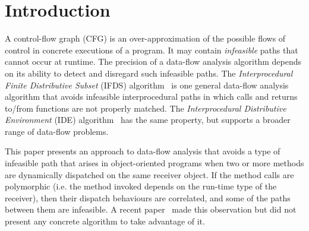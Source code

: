 \section{Introduction}


A control-flow graph (CFG) is an over-approximation of the possible flows 
of control in concrete executions of a program. It may contain \textit{infeasible} 
paths that cannot occur at runtime. The precision of a data-flow analysis algorithm
depends on its ability to detect and disregard such infeasible paths.
The \textit{Interprocedural Finite Distributive Subset} (IFDS) algorithm~\cite{reps1995precise}
is one general data-flow analysis algorithm that 
avoids infeasible interprocedural paths in which calls 
and returns to/from functions are not properly matched. %
The \textit{Interprocedural Distributive Environment} (IDE) algorithm~\cite{sagiv1996precise}
has the same property, but
supports a broader range of data-flow problems.

This paper presents an approach to data-flow analysis that avoids a type
of infeasible path that arises in object-oriented programs when two or more
methods are dynamically dispatched on the same receiver object.
If the
method calls are polymorphic
(i.e. the method invoked depends on the run-time type of the receiver),
then their dispatch 
behaviours are correlated, and some of the paths between them are infeasible. A recent paper~\cite{DBLP:journals/scp/Tip15} made this observation
but did not present any concrete algorithm to take advantage of it.

